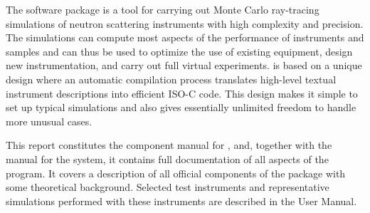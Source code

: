 The software package \MCS is a tool for carrying out Monte Carlo
ray-tracing simulations of neutron scattering instruments with high
complexity and precision. The simulations can compute most aspects of the
performance of instruments and samples
and can thus be used to optimize the use of existing equipment,
design new instrumentation, and carry out full virtual experiments.
\MCS is based on a unique design where an automatic compilation process
translates high-level textual instrument descriptions into efficient
ISO-C code. This design makes it simple to set up typical simulations
and also gives essentially unlimited freedom to handle more unusual
cases.

This report constitutes the component manual for \MCS, and,
together with the manual for the \MCS system, it
contains full documentation of all aspects of the program. It covers
a description of all official components of the \MCS package with
some theoretical background. Selected test
instruments and representative \MCS simulations performed with these
instruments are described in the User Manual.

